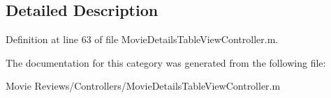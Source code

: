 \subsection{Detailed Description}


Definition at line 63 of file Movie\+Details\+Table\+View\+Controller.\+m.



The documentation for this category was generated from the following file\+:\begin{DoxyCompactItemize}
\item 
Movie Reviews/\+Controllers/Movie\+Details\+Table\+View\+Controller.\+m\end{DoxyCompactItemize}
